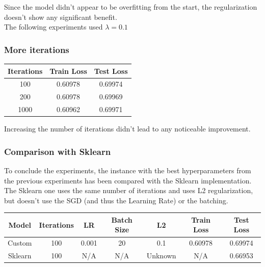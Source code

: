 \documentclass[
	letterpaper, %
	10pt, %
]{class}
\begin{document}
Since the model didn't appear to be overfitting from the start, the regularization doesn't show any significant benefit.\\
The following experiments used $\lambda = 0.1$

\subsubsection{More iterations}

\begin{center}
    \begin{tabular}{ |c|c|c| }
        \hline
        Iterations & Train Loss & Test Loss \\
        \hline
        100        & 0.60978    & 0.69974   \\
        200        & 0.60978    & 0.69969   \\
        1000       & 0.60962    & 0.69971   \\
        \hline
    \end{tabular}
\end{center}

Increasing the number of iterations didn't lead to any noticeable improvement.

\subsubsection{Comparison with Sklearn}

To conclude the experiments, the instance with the best hyperparameters from the previous experiments has been compared with the Sklearn implementation.\\

The Sklearn one uses the same number of iterations and uses L2 regularization, but doesn't use the SGD (and thus the Learning Rate) or the batching.

\begin{center}
    \begin{tabular}{ |c|c|c|c|c|c|c| }
        \hline
        Model   & Iterations & LR    & Batch Size & L2      & Train Loss & Test Loss \\
        \hline
        Custom  & 100        & 0.001 & 20         & 0.1     & 0.60978    & 0.69974   \\
        Sklearn & 100        & N/A   & N/A        & Unknown & N/A        & 0.66953   \\
        \hline
    \end{tabular}
\end{center}
\end{document}
